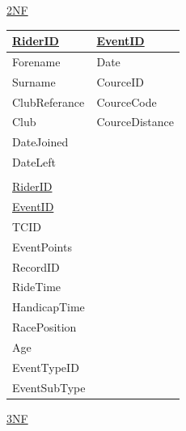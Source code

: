 \underline{2NF}

\begin{tabular}{|l|l|}
\hline
\underline{RiderID} & \underline{EventID} \\ \hline
Forename            & Date                \\ \hline
Surname             & CourceID            \\ \hline
ClubReferance       & CourceCode          \\ \hline
Club                & CourceDistance      \\ \hline
DateJoined          &                     \\ \hline
DateLeft            &                     \\ \hline
                    &                     \\ \hline
\underline{RiderID} &                     \\ \hline
\underline{EventID} &                     \\ \hline 
TCID                &                     \\ \hline 
EventPoints         &                     \\ \hline
RecordID            &                     \\ \hline
RideTime            &                     \\ \hline
HandicapTime        &                     \\ \hline
RacePosition        &                     \\ \hline
Age                 &                     \\ \hline
EventTypeID         &                     \\ \hline
EventSubType        &                     \\ \hline
\end{tabular}

\underline{3NF}

